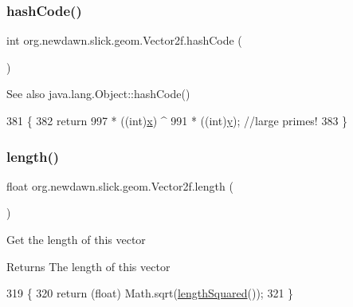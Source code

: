 \subsubsection{\texorpdfstring{hash\+Code()}{hashCode()}}
{\footnotesize\ttfamily int org.\+newdawn.\+slick.\+geom.\+Vector2f.\+hash\+Code (\begin{DoxyParamCaption}{ }\end{DoxyParamCaption})\hspace{0.3cm}{\ttfamily [inline]}}

\begin{DoxySeeAlso}{See also}
java.\+lang.\+Object\+::hash\+Code() 
\end{DoxySeeAlso}

\begin{DoxyCode}
381                           \{
382         \textcolor{keywordflow}{return} 997 * ((int)\mbox{\hyperlink{classorg_1_1newdawn_1_1slick_1_1geom_1_1_vector2f_a3c72cdf13ebc511a472e1a02002fa579}{x}}) ^ 991 * ((int)\mbox{\hyperlink{classorg_1_1newdawn_1_1slick_1_1geom_1_1_vector2f_aa03914f0c3d32063aa90e5bd7b74688e}{y}}); \textcolor{comment}{//large primes! }
383     \}
\end{DoxyCode}
\mbox{\label{classorg_1_1newdawn_1_1slick_1_1geom_1_1_vector2f_ada298fe38d235371020523e9655e9152}} 
\subsubsection{\texorpdfstring{length()}{length()}}
{\footnotesize\ttfamily float org.\+newdawn.\+slick.\+geom.\+Vector2f.\+length (\begin{DoxyParamCaption}{ }\end{DoxyParamCaption})\hspace{0.3cm}{\ttfamily [inline]}}

Get the length of this vector

\begin{DoxyReturn}{Returns}
The length of this vector 
\end{DoxyReturn}

\begin{DoxyCode}
319     \{
320         \textcolor{keywordflow}{return} (\textcolor{keywordtype}{float}) Math.sqrt(\mbox{\hyperlink{classorg_1_1newdawn_1_1slick_1_1geom_1_1_vector2f_a1c4197040609de8f2ef13fc3342ee7da}{lengthSquared}}());
321     \}
\end{DoxyCode}
\mbox{\label{classorg_1_1newdawn_1_1slick_1_1geom_1_1_vector2f_a1c4197040609de8f2ef13fc3342ee7da}} 
